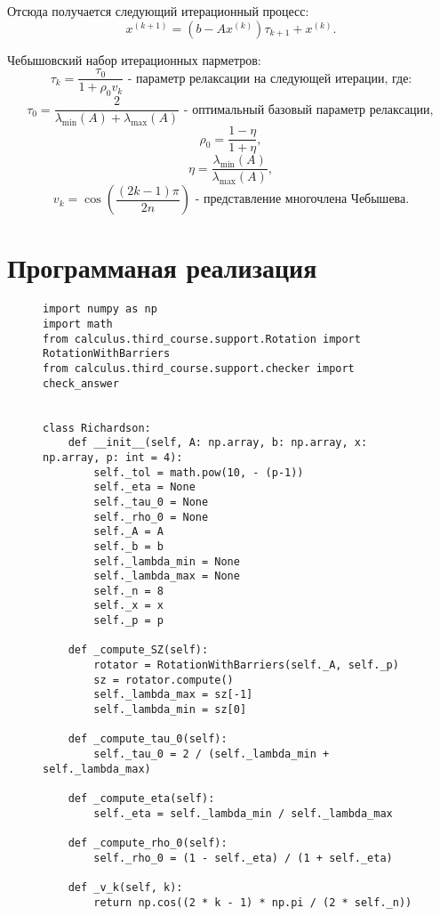 \documentclass[a4paper,12pt]{article}
\begin{document}
	Отсюда получается следующий итерационный процесс:
	\[
		x^{(k+1)} = \left(b - A x^{(k)}\right) \tau_{k+1} + x^{(k)}.
	\]
	
	Чебышовский набор итерационных парметров:
	$$\tau_k = \frac{\tau_0}{1 + \rho_0 v_k} \text{ - параметр релаксации на следующей итерации, где:} $$
	$$\tau_0 = \frac{2}{\lambda_{\min}(A) + \lambda_{\max}(A)} \text{ - оптимальный базовый параметр релаксации},$$
	$$\rho_0 = \frac{1 - \eta}{1 + \eta},$$
	$$\eta = \frac{\lambda_{\min}(A)}{\lambda_{\max}(A)},$$
	$$v_k = \cos\left(\frac{(2k - 1)\pi}{2n}\right) \text{ - представление многочлена Чебышева}.$$
	
	\newpage
	\section{Программаная реализация}
	\begin{figure}[h]
		\begin{verbatim}
import numpy as np
import math
from calculus.third_course.support.Rotation import RotationWithBarriers
from calculus.third_course.support.checker import check_answer


class Richardson:
	def __init__(self, A: np.array, b: np.array, x: np.array, p: int = 4):
		self._tol = math.pow(10, - (p-1))
		self._eta = None
		self._tau_0 = None
		self._rho_0 = None
		self._A = A
		self._b = b
		self._lambda_min = None
		self._lambda_max = None
		self._n = 8
		self._x = x
		self._p = p
	
	def _compute_SZ(self):
		rotator = RotationWithBarriers(self._A, self._p)
		sz = rotator.compute()
		self._lambda_max = sz[-1]
		self._lambda_min = sz[0]
	
	def _compute_tau_0(self):
		self._tau_0 = 2 / (self._lambda_min + self._lambda_max)
	
	def _compute_eta(self):
		self._eta = self._lambda_min / self._lambda_max
	
	def _compute_rho_0(self):
		self._rho_0 = (1 - self._eta) / (1 + self._eta)

	def _v_k(self, k):
		return np.cos((2 * k - 1) * np.pi /	(2 * self._n))
		\end{verbatim}
	\end{figure}
	\newpage
\end{document}
